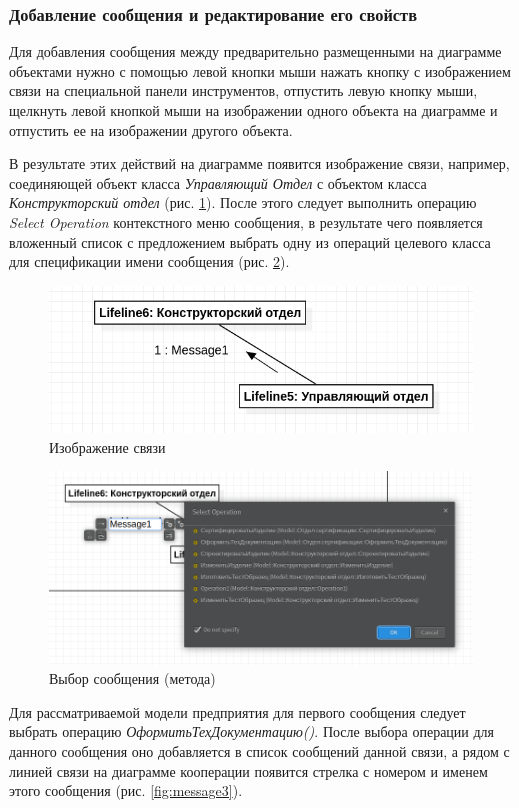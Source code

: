 \documentclass[a4paper,12pt]{extreport}
\begin{document}
\subsubsection*{Добавление сообщения и редактирование его свойств}
Для добавления сообщения между предварительно размещенными на диаграмме объектами нужно с помощью левой кнопки мыши нажать кнопку с изображением связи на специальной панели инструментов, отпустить левую кнопку мыши, щелкнуть левой кнопкой мыши на изображении одного объекта на диаграмме и отпустить ее на изображении другого объекта.

В результате этих действий на диаграмме появится изображение связи, например, соединяющей объект класса \textit{Управляющий Отдел} с объектом класса \textit{Конструкторский отдел} (рис. \ref{fig:message1}). После этого следует выполнить операцию \textit{Select Operation} контекстного меню сообщения, в результате чего появляется вложенный список с предложением выбрать одну из операций целевого класса для спецификации имени сообщения (рис. \ref{fig:message2}).

\begin{figure}[h!]
	\centering
	\includegraphics[width=0.7\linewidth]{images/message1}
	\caption{Изображение связи}
	\label{fig:message1}
\end{figure}

\begin{figure}[h!]
	\centering
	\includegraphics[width=0.7\linewidth]{images/message2}
	\caption{Выбор сообщения (метода)}
	\label{fig:message2}
\end{figure}

Для рассматриваемой модели предприятия для первого сообщения следует выбрать операцию \textit{ОформитьТехДокументацию()}. После выбора операции для данного сообщения оно добавляется в список сообщений данной связи, а рядом с линией связи на диаграмме кооперации появится стрелка с номером и именем этого сообщения (рис. \ref{fig:message3}).
\end{document}
